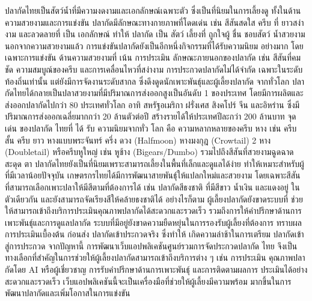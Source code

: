 \indent ปลากัดไทยเป็นสัตว์น้ำที่มีความงดงามและเอกลักษณ์เฉพาะตัว ซึ่งเป็นที่นิยมในการเลี้ยงดู
ทั้งในด้านความสวยงามและการแข่งขัน \cite{ngthai2021betta} ปลากัดมีลักษณะทางกายภาพที่โดดเด่น เช่น สีสันสดใส
ครีบ ที่ ยาวสง่า งาม และลวดลายที่ เป็น เอกลักษณ์ ทำให้ ปลากัด เป็น สัตว์ เลี้ยงที่ ถูกใจผู้ ชื่น ชอบสัตว์
น้ำสวยงาม นอกจากความสวยงามแล้ว การแข่งขันปลากัดยังเป็นอีกหนึ่งกิจกรรมที่ได้รับความนิยม
อย่างมาก โดยเฉพาะการแข่งขัน ด้านความสวยงามที่ เน้น การประเมิน ลักษณะภายนอกของปลากัด
เช่น สีสันที่คมชัด ความสมบูณ์ของครีบ และการเคลื่อนไหวที่สง่างาม การประกวดปลากัดไม่ได้จำกัด
เฉพาะในระดับท้องถิ่นเท่านั้น แต่ยังมีการจัดงานระดับสากล ซึ่งดึงดูดนักเพาะพันธุ์และผู้เลี้ยงปลากัด
จากทั่วโลก ปลากัดไทยได้กลายเป็นปลาสวยงามที่มีปริมาณการส่งออกสูงเป็นอันดับ 1 ของประเทศ
โดยมีการผลิตและส่งออกปลากัดไปกว่า 80 ประเทศทั่วโลก อาทิ สหรัฐอเมริกา ฝรั่งเศส สิงคโปร์ จีน
และอิหร่าน ซึ่งมีปริมาณการส่งออกเฉลี่ยมากกว่า 20 ล้านตัวต่อปี สร้างรายได้ให้ประเทศปีละกว่า \cite{nstda2020betta}
200 ล้านบาท จุด เด่น ของปลากัด ไทยที่ ได้ รับ ความนิยมจากทั่ว โลก คือ ความหลากหลายของครีบ
หาง เช่น ครีบ สั้น ครีบ ยาว หางแบบพระจันทร์ ครึ่ง ดวง (Halfmoon) หางมงกุฎ (Crowtail) 2 หาง
(Doubletail) หรือครีบหูใหญ่ เช่น หูช้าง (Bigears/Dumbo) รวมไปถึงสีสันที่สวยงามฉูดฉาดสะดุด
ตา ปลากัดไทยยังเป็นที่นิยมเพราะสามารถเลี้ยงในพื้นที่เล็กและดูแลได้ง่าย ทำให้เหมาะสำหรับผู้
ที่มีเวลาน้อยปัจจุบัน เกษตรกรไทยได้มีการพัฒนาสายพันธุ์ให้แปลกใหม่และสวยงาม โดยเฉพาะสีสัน
ที่สามารถเลือกเพาะปลาให้มีสีตามที่ต้องการได้ เช่น ปลากัดสีธงชาติ ที่มีสีขาว น้ำเงิน และแดงอยู่
ในตัวเดียวกัน และยังสามารถจัดเรียงสีให้คล้ายธงชาติได้ อย่างไรก็ตาม ผู้เลี้ยงปลากัดยังขาดระบบที่
ช่วยให้สามารถเข้าถึงบริการประเมินคุณภาพปลากัดได้สะดวกและรวดเร็ว รวมถึงการให้คำปรึกษาด้านการเพาะพันธุ์และการดูแลปลากัด ระบบที่มีอยู่ยังขาดความยืดหยุ่นในการรองรับผู้เลี้ยงที่ต้องการ
ทราบผลการประเมินเบื้องต้น ก่อนส่ง ปลากัดเข้าประกวดจริง ซึ่งทำให้ เกิดความล่าช้าในการเตรียม
ปลากัดเข้าสู่การประกวด จากปัญหานี้ การพัฒนาเว็บแอปพลิเคชันศูนย์รวมการจัดประกวดปลากัด
ไทย จึงเป็นทางเลือกที่สำคัญในการช่วยให้ผู้เลี้ยงปลากัดสามารถเข้าถึงบริการต่าง ๆ เช่น การประเมิน
คุณภาพปลากัดโดย AI หรือผู้เชี่ยวชาญ การรับคำปรึกษาด้านการเพาะพันธุ์ และการติดตามผลการ
ประเมินได้อย่างสะดวกและรวดเร็ว เว็บแอปพลิเคชันนี้จะเป็นเครื่องมือที่ช่วยให้ผู้เลี้ยงมีความพร้อม
มากขึ้นในการพัฒนาปลากัดและเพิ่มโอกาสในการแข่งขัน

\par\endgroup
\clearpage

